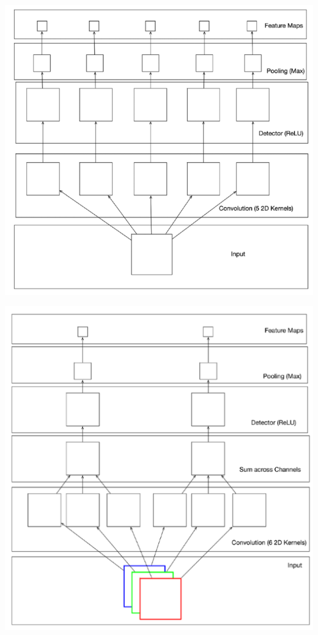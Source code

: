 \begin{minipage}{0.45\linewidth}
    \includegraphics[width=1\linewidth]{Imagenes/04/PoolingFilter.png}  
    \label{Fig:04-poolingFilter}

\end{minipage} \hfill
\begin{minipage}{0.45\linewidth}
    \includegraphics[width=1\linewidth]{Imagenes/04/PoolingMultiple.png}  
    \label{Fig:04-poolingMultiple }
\end{minipage}

